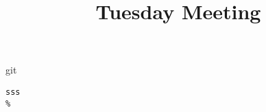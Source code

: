 \documentclass{beamer}
\title{Tuesday Meeting}
\begin{document}
 	
 	\newcommand{\redpause}{\addtocounter{beamerpauses}{-1}\pause\color<+>{red}}
 	
 	\begin{frame}
 		\titlepage  
 		\begin{center}
 		\end{center}
 	\end{frame}

 	
 	\begin{frame}{git}
\begin{verbatim}
sss
%



\end{verbatim}

 	\end{frame}
 	
 
\end{document}
